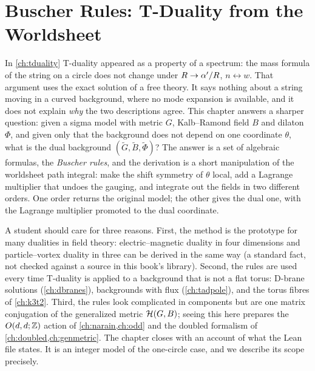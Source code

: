 \chapter{Buscher Rules: T-Duality from the Worldsheet}\label{ch:buscher}

In \cref{ch:tduality} T-duality appeared as a property of a spectrum: the mass formula of the
string on a circle does not change under $R\to\alpha'/R$, $n\leftrightarrow w$. That argument uses
the exact solution of a free theory. It says nothing about a string moving in a curved
background, where no mode expansion is available, and it does not explain \emph{why} the
two descriptions agree. This chapter answers a sharper question: given a sigma model with
metric $G$, Kalb--Ramond field $B$ and dilaton $\Phi$, and given only that the background
does not depend on one coordinate $\theta$, what is the dual background
$(\tilde G,\tilde B,\tilde\Phi)$? The answer is a set of algebraic formulas, the
\emph{Buscher rules}, and the derivation is a short manipulation of the
worldsheet path integral: make the shift symmetry of $\theta$ local, add a Lagrange multiplier
that undoes the gauging, and integrate out the fields in two different orders. One order
returns the original model; the other gives the dual one, with the Lagrange multiplier
promoted to the dual coordinate.

A student should care for three reasons. First, the method is the prototype for many
dualities in field theory: electric--magnetic duality in four dimensions and particle--vortex
duality in three can be derived in the same way (a standard fact, not checked against a source
in this book's library). Second, the rules are used every time T-duality
is applied to a background that is not a flat torus: D-brane solutions
(\cref{ch:dbranes}), backgrounds with flux (\cref{ch:tadpole}), and the torus fibres of
\cref{ch:k3t2}. Third, the rules look complicated in components but are one matrix
conjugation of the generalized metric $\mathcal{H}(G,B)$; seeing this here prepares the $O(d,d;\mathbb{Z})$
action of \cref{ch:narain,ch:odd} and the doubled formalism of \cref{ch:doubled,ch:genmetric}.
The chapter closes with an account of what the Lean file
 states. It is an integer model of the
one-circle case, and we describe its scope precisely.

